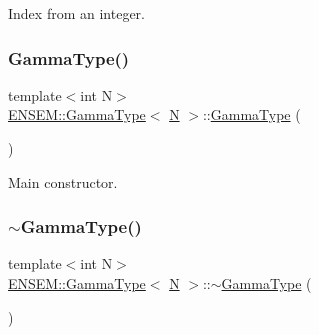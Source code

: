 Index from an integer. 

\mbox{\label{classENSEM_1_1GammaType_a40badc5d1ed98704d66277e171adb121}} 
\subsubsection{\texorpdfstring{GammaType()}{GammaType()}\hspace{0.1cm}{\footnotesize\ttfamily [5/6]}}
{\footnotesize\ttfamily template$<$int N$>$ \\
\mbox{\hyperlink{classENSEM_1_1GammaType}{E\+N\+S\+E\+M\+::\+Gamma\+Type}}$<$ \mbox{\hyperlink{adat__devel_2lib_2hadron_2operator__name__util_8cc_a7722c8ecbb62d99aee7ce68b1752f337}{N}} $>$\+::\mbox{\hyperlink{classENSEM_1_1GammaType}{Gamma\+Type}} (\begin{DoxyParamCaption}{ }\end{DoxyParamCaption})\hspace{0.3cm}{\ttfamily [inline]}}



Main constructor. 

\mbox{\label{classENSEM_1_1GammaType_a2cc80e9a9f044b1b9b344f3419718a5e}} 
\subsubsection{\texorpdfstring{$\sim$GammaType()}{~GammaType()}\hspace{0.1cm}{\footnotesize\ttfamily [3/3]}}
{\footnotesize\ttfamily template$<$int N$>$ \\
\mbox{\hyperlink{classENSEM_1_1GammaType}{E\+N\+S\+E\+M\+::\+Gamma\+Type}}$<$ \mbox{\hyperlink{adat__devel_2lib_2hadron_2operator__name__util_8cc_a7722c8ecbb62d99aee7ce68b1752f337}{N}} $>$\+::$\sim$\mbox{\hyperlink{classENSEM_1_1GammaType}{Gamma\+Type}} (\begin{DoxyParamCaption}{ }\end{DoxyParamCaption})\hspace{0.3cm}{\ttfamily [inline]}}



